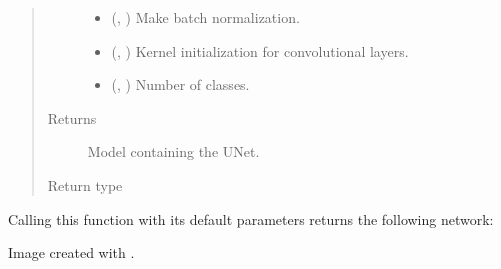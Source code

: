 \documentclass[letterpaper,10pt,english]{sphinxmanual}
\begin{document}
\begin{fulllineitems}
\begin{quote}
\begin{description}
\begin{itemize}
\item {} 
 (, ) \textendash{} Make batch normalization.

\item {} 
 (, ) \textendash{} Kernel initialization for convolutional layers.

\item {} 
 (, ) \textendash{} Number of classes.

\end{itemize}

\item[{Returns}] \leavevmode
{} \textendash{} Model containing the U\sphinxhyphen{}Net.

\item[{Return type}] \leavevmode
{}

\end{description}\end{quote}

Calling this function with its default parameters returns the following network:


Image created with .

\end{fulllineitems}

\end{document}
